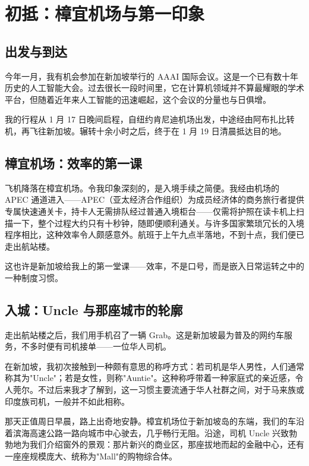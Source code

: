 \chapter{初抵：樟宜机场与第一印象}

\section{出发与到达}

今年一月，我有机会参加在新加坡举行的 AAAI 国际会议。这是一个已有数十年历史的人工智能大会。过去很长一段时间里，它在计算机领域并不算最耀眼的学术平台，但随着近年来人工智能的迅速崛起，这个会议的分量也与日俱增。

我的行程从 1 月 17 日晚间启程，自纽约肯尼迪机场出发，中途经由阿布扎比转机，再飞往新加坡。辗转十余小时之后，终于在 1 月 19 日清晨抵达目的地。

\section{樟宜机场：效率的第一课}

飞机降落在樟宜机场。令我印象深刻的，是入境手续之简便。我经由机场的 APEC 通道进入——APEC（亚太经济合作组织）为成员经济体的商务旅行者提供专属快速通关卡，持卡人无需排队经过普通入境柜台——仅需将护照在读卡机上扫描一下，整个过程大约只有十秒钟，随即便顺利通关。与许多国家繁琐冗长的入境程序相比，这种效率令人颇感意外。航班于上午九点半落地，不到十点，我们便已走出航站楼。

这也许是新加坡给我上的第一堂课——效率，不是口号，而是嵌入日常运转之中的一种制度习惯。

\section{入城：Uncle 与那座城市的轮廓}

走出航站楼之后，我们用手机召了一辆 Grab。这是新加坡最为普及的网约车服务，不多时便有司机接单——一位华人司机。

在新加坡，我初次接触到一种颇有意思的称呼方式：若司机是华人男性，人们通常称其为"Uncle"；若是女性，则称"Auntie"。这种称呼带着一种家庭式的亲近感，令人莞尔。不过后来我才了解到，这一习惯主要流通于华人社群之间，对于马来族或印度族司机，一般并不如此相称。

那天正值周日早晨，路上出奇地安静。樟宜机场位于新加坡岛的东端，我们的车沿着滨海高速公路一路向城市中心驶去，几乎畅行无阻。沿途，司机 Uncle 兴致勃勃地为我们介绍窗外的景观：那片新兴的商业区，那座拔地而起的金融中心，还有一座座规模庞大、统称为"Mall"的购物综合体。

